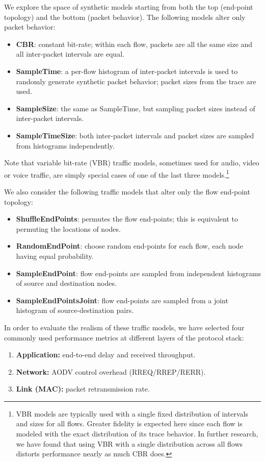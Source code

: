 \documentclass[conference]{IEEEtran}
\newcommand{\caps}[1]{{\small{#1}}}
\begin{document}
We explore the space of synthetic models starting from both the top (end-point topology) and the bottom (packet behavior). The following models alter only packet behavior:
\begin{itemize}
\item \textbf{\caps{CBR}}: constant bit-rate; within each flow, packets are all the same size and all inter-packet intervals are equal.
\item \textbf{SampleTime}: a per-flow histogram of inter-packet intervals is used to randomly generate synthetic packet behavior; packet sizes from the trace are used.
\item \textbf{SampleSize}: the same as SampleTime, but sampling packet sizes instead of inter-packet intervals.
\item \textbf{SampleTimeSize}: both inter-packet intervals and packet sizes are sampled from histograms independently.
\end{itemize}
Note that variable bit-rate (\caps{VBR}) traffic models, sometimes used for audio, video or voice traffic, are simply special cases of one of the last three models.\footnote{\scriptsize{VBR} models are typically used with a single fixed distribution of intervals and sizes for all flows. Greater fidelity is expected here since each flow is modeled with the exact distribution of its trace behavior. In further research, we have found that using {\scriptsize{VBR}} with a single distribution across all flows distorts performance nearly as much {\scriptsize{CBR}} does.}

We also consider the following traffic models that alter only the flow end-point topology:
\begin{itemize}
\item \textbf{ShuffleEndPoints}: permutes the flow end-points; this is equivalent to permuting the locations of nodes.
\item \textbf{RandomEndPoint}: choose random end-points for each flow, each node having equal probability.
\item \textbf{SampleEndPoint}: flow end-points are sampled from independent histograms of source and destination nodes.
\item \textbf{SampleEndPointsJoint}: flow end-points are sampled from a joint histogram of source-destination pairs.
\end{itemize}

In order to evaluate the realism of these traffic models, we have selected four commonly used performance metrics at different layers of the protocol stack:
\begin{enumerate}
\setlength{\itemsep}{0em}
\item \textbf{Application:} end-to-end delay and received throughput.
\item \textbf{Network:} \caps{AODV} control overhead (\caps{RREQ/RREP/RERR}).
\item \textbf{Link (\caps{MAC}):} packet retransmission rate.
\end{enumerate}
\end{document}
